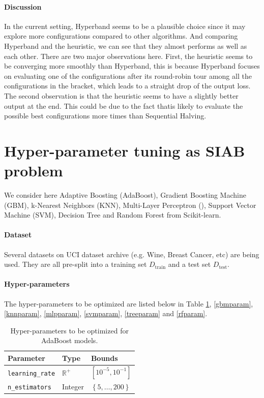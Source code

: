 \documentclass[twoside,11pt]{article}
\begin{document}
\paragraph{\textbf{Discussion}} In the current setting, Hyperband seems to be a plausible choice since it may explore more configurations compared to other algorithms. And comparing Hyperband and the heuristic, we can see that they almost performs as well as each other. There are two major observations here. First, the heuristic seems to be converging more smoothly than Hyperband, this is because Hyperband focuses on evaluating one of the configurations after its round-robin tour among all the configurations in the bracket, which leads to a straight drop of the output loss. The second observation is that the heuristic seems to have a slightly better output at the end. This could be due to the fact that\TTTS is likely to evaluate the possible best configurations more times than Sequential Halving.


\section{Hyper-parameter tuning as SIAB problem}

We consider here Adaptive Boosting (AdaBoost), Gradient Boosting Machine (GBM), k-Nearest Neighbors (KNN), Multi-Layer Perceptron (\MLP), Support Vector Machine (SVM), Decision Tree and Random Forest from Scikit-learn.

\paragraph{\textbf{Dataset}} Several datasets on UCI dataset archive (e.g. Wine, Breast Cancer, etc) are being used. They are all pre-split into a training set $D_{\operatorname{train}}$ and a test set $D_{\operatorname{test}}$.

\paragraph{\textbf{Hyper-parameters}} The hyper-parameters to be optimized are listed below in Table \ref{adaparam}, \ref{gbmparam},  \ref{knnparam}, \ref{mlpparam}, \ref{svmparam}, \ref{treeparam} and \ref{rfparam}.

\begin{table}[ht]
\centering
\begin{tabular}{@{}lll@{}}
\toprule
\textbf{Parameter}             & \textbf{Type}  & \textbf{Bounds}                          \\ \midrule
\texttt{learning\_rate}      & $\mathbb{R}^+$ & $\left[10^{-5}, 10^{-1}\right]$                         \\
\texttt{n\_estimators}       & Integer        & $\left\lbrace 5,\dots, 200 \right\rbrace$
\end{tabular}
\caption{Hyper-parameters to be optimized for AdaBoost models.}
\label{adaparam}
\end{table}
\end{document}
